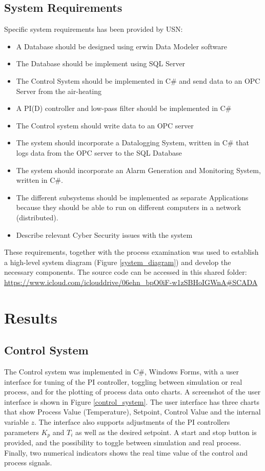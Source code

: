 \documentclass[conference]{IEEEtran}
\begin{document}
\subsection{System Requirements}
Specific system requirements has been provided by USN:
\begin{itemize}
    \item A Database should be designed using erwin Data Modeler software
    \item The Database should be implement using SQL Server
    \item The Control System should be implemented in C\# and send data to an OPC Server from the air-heating 
    \item A PI(D) controller and low-pass filter should be implemented in C\#
    \item The Control system should write data to an OPC server
    \item The system should incorporate a Datalogging System, written in C\# that logs data from the OPC server to the SQL Database
    \item The system should incorporate an Alarm Generation and Monitoring System, written in C\#.
    \item The different subsystems should be implemented as separate Applications because they should be able to 
    run on different computers in a network (distributed).
    \item Describe relevant Cyber Security issues with the system
\end{itemize} 

These requirements, together with the process examination was used to establish a high-level system diagram (Figure \ref{system_diagram}) and develop the necessary components. The source code can be accessed in this shared folder:
\url{https://www.icloud.com/iclouddrive/06ehn_bpO0iF-w1zSBHoIGWnA#SCADA}

\section{Results}
\subsection{Control System}

The Control system was implemented in C\#, Windows Forms, with a user interface for tuning of the PI controller, toggling between simulation or real process, and for the plotting of process data onto charts. A screenshot of the user interface is shown in Figure \ref{control_system}. The user interface has three charts that show Process Value (Temperature), Setpoint, Control Value and the internal variable $z$. The interface also supports adjustments of the PI controllers parameters $K_p$ and $T_i$ as well as the desired setpoint. A start and stop button is provided, and the possibility to toggle between simulation and real process. Finally, two numerical indicators shows the real time value of the control and process signals. 
\end{document}
